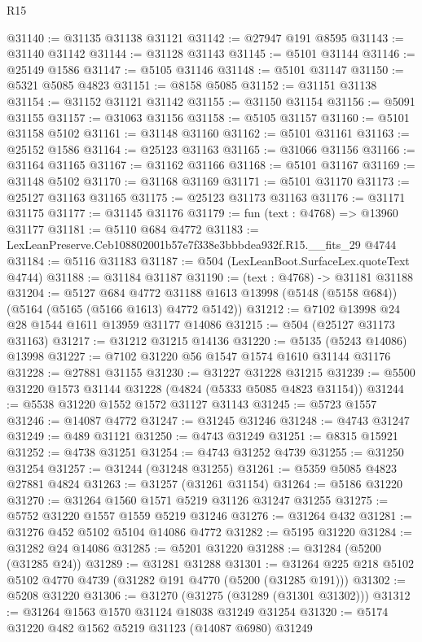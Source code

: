 \begin{lexlean}{R15}
\begin{coremodule}
{{{{{{{{{{{@31140 := @31135 @31138 @31121
@31142 := @27947 @191 @8595
@31143 := @31140 @31142
@31144 := @31128 @31143
@31145 := @5101 @31144
@31146 := @25149 @1586
@31147 := @5105 @31146
@31148 := @5101 @31147
@31150 := @5321 @5085 @4823
@31151 := @8158 @5085
@31152 := @31151 @31138
@31154 := @31152 @31121 @31142
@31155 := @31150 @31154
@31156 := @5091 @31155
@31157 := @31063 @31156
@31158 := @5105 @31157
@31160 := @5101 @31158 @5102
@31161 := @31148 @31160
@31162 := @5101 @31161
@31163 := @25152 @1586
@31164 := @25123 @31163
@31165 := @31066 @31156
@31166 := @31164 @31165
@31167 := @31162 @31166
@31168 := @5101 @31167
@31169 := @31148 @5102
@31170 := @31168 @31169
@31171 := @5101 @31170
@31173 := @25127 @31163 @31165
@31175 := @25123 @31173 @31163
@31176 := @31171 @31175
@31177 := @31145 @31176
@31179 := fun (text : @4768) => @13960 @31177
@31181 := @5110 @684 @4772
@31183 := LexLeanPreserve.Ceb108802001b57e7f338e3bbbdea932f.R15.__fits_29 @4744
@31184 := @5116 @31183
@31187 := @504 (LexLeanBoot.SurfaceLex.quoteText @4744)
@31188 := @31184 @31187
@31190 := (text : @4768) -> @31181 @31188
@31204 := @5127
    @684
    @4772
    @31188
    @1613
    @13998
    (@5148 (@5158 @684))
    (@5164 (@5165 (@5166 @1613) @4772 @5142))
@31212 := @7102 @13998 @24 @28 @1544 @1611 @13959 @31177 @14086
@31215 := @504 (@25127 @31173 @31163)
@31217 := @31212 @31215 @14136
@31220 := @5135 (@5243 @14086) @13998
@31227 := @7102 @31220 @56 @1547 @1574 @1610 @31144 @31176
@31228 := @27881 @31155
@31230 := @31227 @31228 @31215
@31239 := @5500 @31220 @1573 @31144 @31228 (@4824 (@5333 @5085 @4823 @31154))
@31244 := @5538 @31220 @1552 @1572 @31127 @31143
@31245 := @5723 @1557
@31246 := @14087 @4772
@31247 := @31245 @31246
@31248 := @4743 @31247
@31249 := @489 @31121
@31250 := @4743 @31249
@31251 := @8315 @15921
@31252 := @4738 @31251
@31254 := @4743 @31252 @4739
@31255 := @31250 @31254
@31257 := @31244 (@31248 @31255)
@31261 := @5359 @5085 @4823 @27881 @4824
@31263 := @31257 (@31261 @31154)
@31264 := @5186 @31220
@31270 := @31264 @1560 @1571 @5219 @31126 @31247 @31255
@31275 := @5752 @31220 @1557 @1559 @5219 @31246
@31276 := @31264 @432
@31281 := @31276 @452 @5102 @5104 @14086 @4772
@31282 := @5195 @31220
@31284 := @31282 @24 @14086
@31285 := @5201 @31220
@31288 := @31284 (@5200 (@31285 @24))
@31289 := @31281 @31288
@31301 := @31264 @225 @218 @5102 @5102 @4770 @4739 (@31282 @191 @4770 (@5200 (@31285 @191)))
@31302 := @5208 @31220
@31306 := @31270 (@31275 (@31289 (@31301 @31302)))
@31312 := @31264 @1563 @1570 @31124 @18038 @31249 @31254
@31320 := @5174 @31220 @482 @1562 @5219 @31123 (@14087 @6980) @31249
}}}}}}}}}}}
\end{coremodule}
\end{lexlean}
